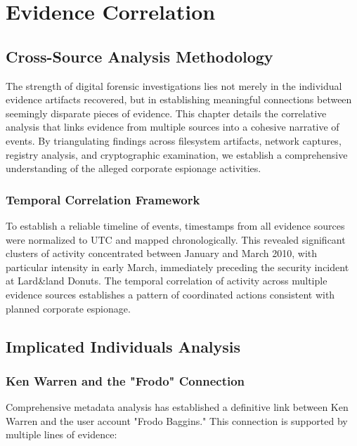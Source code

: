 \chapter{Evidence Correlation}

\section{Cross-Source Analysis Methodology}
The strength of digital forensic investigations lies not merely in the individual evidence artifacts recovered, but in establishing meaningful connections between seemingly disparate pieces of evidence. This chapter details the correlative analysis that links evidence from multiple sources into a cohesive narrative of events. By triangulating findings across filesystem artifacts, network captures, registry analysis, and cryptographic examination, we establish a comprehensive understanding of the alleged corporate espionage activities.

\subsection{Temporal Correlation Framework}
To establish a reliable timeline of events, timestamps from all evidence sources were normalized to UTC and mapped chronologically. This revealed significant clusters of activity concentrated between January and March 2010, with particular intensity in early March, immediately preceding the security incident at Lard\&land Donuts. The temporal correlation of activity across multiple evidence sources establishes a pattern of coordinated actions consistent with planned corporate espionage.

\section{Implicated Individuals Analysis}
\subsection{Ken Warren and the "Frodo" Connection}
Comprehensive metadata analysis has established a definitive link between Ken Warren and the user account "Frodo Baggins." This connection is supported by multiple lines of evidence:

